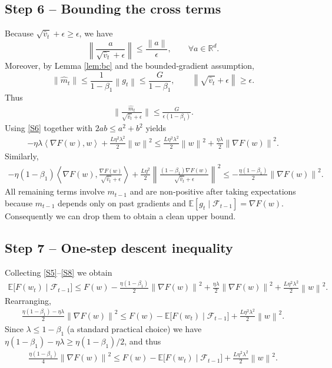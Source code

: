 \documentclass{article}
\newcommand{\E}{\mathbb{E}}
\newcommand{\R}{\mathbb{R}}
\newcommand{\norm}[1]{\left\lVert #1 \right\rVert}
\newcommand{\ip}[2]{\left\langle #1,#2 \right\rangle}
\begin{document}
\subsection*{Step 6 – Bounding the cross terms}
Because $\sqrt{\hat v_t}+\epsilon\ge \epsilon$, we have
\[
    \norm{\frac{a}{\sqrt{\hat v_t}+\epsilon}} \le \frac{\norm{a}}{\epsilon},\qquad\forall a\in\R^d .
\]
Moreover, by Lemma \ref{lem:bc} and the bounded‑gradient assumption,
\[
    \norm{\hat m_t}
        \le \frac{1}{1-\beta_1}\norm{g_t}
        \le \frac{G}{1-\beta_1},
    \qquad
    \norm{\sqrt{\hat v_t}+\epsilon}\ge \epsilon .
\]
Thus
\begin{align}
    \bigg\|\frac{\hat m_t}{\sqrt{\hat v_t}+\epsilon}\bigg\|
    \le \frac{G}{\epsilon(1-\beta_1)} .
    \tag{S6}
\end{align}
Using \eqref{S6} together with $2ab\le a^2+b^2$ yields
\begin{align}
    -\eta\lambda \ip{\nabla F(w)}{w}
    +\frac{L\eta^2\lambda^2}{2}\norm{w}^2
    \le \frac{L\eta^2\lambda^2}{2}\norm{w}^2
    +\frac{\eta\lambda}{2}\norm{\nabla F(w)}^2 .
    \tag{S7}
\end{align}
Similarly,
\begin{align}
    -\eta (1-\beta_1)\ip{\nabla F(w)}{\frac{\nabla F(w)}{\sqrt{\hat v_t}+\epsilon}}
    +\frac{L\eta^2}{2}\norm{\frac{(1-\beta_1)\nabla F(w)}{\sqrt{\hat v_t}+\epsilon}}^2
    \le
    -\frac{\eta(1-\beta_1)}{2}\norm{\nabla F(w)}^2 .
    \tag{S8}
\end{align}
All remaining terms involve $m_{t-1}$ and are non‑positive after taking expectations because $m_{t-1}$ depends only on past gradients and $\E[g_t\mid\mathcal{F}_{t-1}]=\nabla F(w)$. Consequently we can drop them to obtain a clean upper bound.

\subsection*{Step 7 – One‑step descent inequality}
Collecting \eqref{S5}–\eqref{S8} we obtain
\begin{align}
    \E\!\big[F(w_t)\mid\mathcal{F}_{t-1}\big]
    \le
    F(w) -\frac{\eta(1-\beta_1)}{2}\norm{\nabla F(w)}^2
    +\frac{\eta\lambda}{2}\norm{\nabla F(w)}^2
    +\frac{L\eta^2\lambda^2}{2}\norm{w}^2 .
    \tag{S9}
\end{align}
Rearranging,
\begin{align}
    \frac{\eta(1-\beta_1)-\eta\lambda}{2}\norm{\nabla F(w)}^2
    \le
    F(w)-\E\!\big[F(w_t)\mid\mathcal{F}_{t-1}\big]
    +\frac{L\eta^2\lambda^2}{2}\norm{w}^2 .
    \tag{S10}
\end{align}
Since $\lambda\le 1-\beta_1$ (a standard practical choice) we have $\eta(1-\beta_1)-\eta\lambda\ge \eta(1-\beta_1)/2$, and thus
\begin{align}
    \frac{\eta(1-\beta_1)}{4}\norm{\nabla F(w)}^2
    \le
    F(w)-\E\!\big[F(w_t)\mid\mathcal{F}_{t-1}\big]
    +\frac{L\eta^2\lambda^2}{2}\norm{w}^2 .
    \tag{S11}
\end{align}
\end{document}
